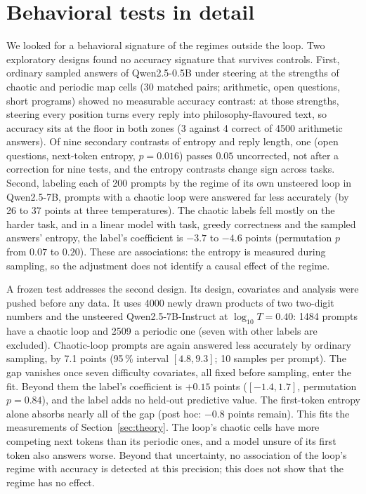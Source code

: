 \documentclass[11pt,letterpaper]{article}
\begin{document}
\section{Behavioral tests in detail}
\label{sec:behaviour}
We looked for a behavioral signature of the regimes outside the loop. Two exploratory designs found no accuracy
signature that survives controls. First, ordinary sampled answers of Qwen2.5-0.5B under steering at the strengths of chaotic and periodic map
cells (30 matched pairs; arithmetic, open questions, short programs) showed no measurable accuracy contrast: at those
strengths, steering every position turns every reply into philosophy-flavoured text, so accuracy sits at the floor in
both zones (3 against 4 correct of 4500 arithmetic answers). Of nine secondary contrasts of entropy and reply length,
one (open questions, next-token entropy, $p=0.016$) passes $0.05$ uncorrected, not after a correction for nine tests,
and the entropy contrasts change sign across tasks. Second, labeling each of 200 prompts by the regime of its own unsteered loop in Qwen2.5-7B, prompts with
a chaotic loop were answered far less accurately (by 26 to 37 points at three temperatures). The chaotic labels fell
mostly on the harder task, and in a linear model with task, greedy correctness and the sampled answers' entropy, the
label's coefficient is $-3.7$ to $-4.6$ points (permutation $p$ from $0.07$ to $0.20$). These are associations: the
entropy is measured during sampling, so the adjustment does not identify a causal effect of the regime.

A frozen test addresses the second design. Its design, covariates and analysis were pushed before any data. It uses
4000 newly drawn products of two two-digit numbers and the unsteered Qwen2.5-7B-Instruct at $\log_{10}T=0.40$: 1484 prompts
have a chaotic loop and 2509 a periodic one (seven with other labels are excluded). Chaotic-loop prompts are again answered less accurately by ordinary
sampling, by 7.1 points (95\,\% interval $[4.8,9.3]$; 10 samples per prompt). The gap vanishes once seven difficulty
covariates, all fixed before sampling, enter the fit. Beyond them the label's coefficient is $+0.15$ points
($[-1.4,1.7]$, permutation $p=0.84$), and the label adds no held-out predictive value. The first-token entropy alone
absorbs nearly all of the gap (post hoc: $-0.8$ points remain). This fits the measurements of
Section~\ref{sec:theory}. The loop's chaotic cells have more competing next tokens than its periodic ones, and a model
unsure of its first token also answers worse. Beyond that uncertainty, no association of the loop's regime with accuracy is detected at
this precision; this does not show that the regime has no effect.
\end{document}
